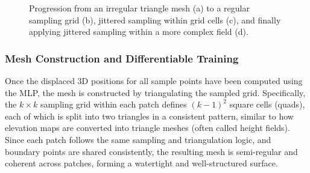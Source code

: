 \begin{figure}[ht]
\begin{adjustbox}{center}
  \end{adjustbox}
  \caption{Progression from an irregular triangle mesh (a) to a regular sampling grid (b), jittered sampling within grid cells (c), and finally applying jittered sampling within a more complex field (d).}
  \label{fig:progression_sampling}
\end{figure}






\subsubsection{Mesh Construction and Differentiable Training}

Once the displaced 3D positions for all sample points have been computed using the MLP, the mesh is constructed by triangulating the sampled grid.  
Specifically, the $k \times k$ sampling grid within each patch defines $(k-1)^2$ square cells (quads), each of which is split into two triangles in a consistent pattern, similar to how elevation maps are converted into triangle meshes (often called height fields).  
Since each patch follows the same sampling and triangulation logic, and boundary points are shared consistently, the resulting mesh is semi-regular and coherent across patches, forming a watertight and well-structured surface.  

